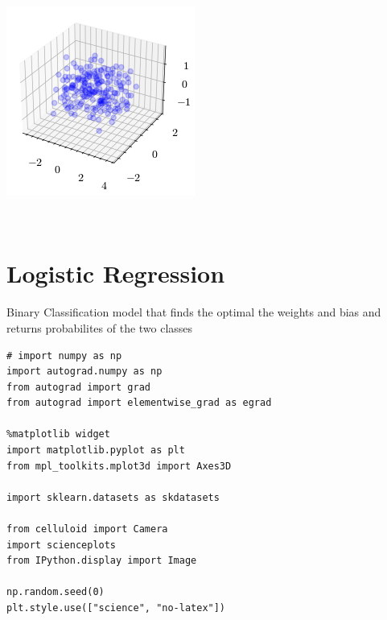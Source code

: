 \documentclass[openany]{book}
\begin{document}
    \begin{center}
    \includegraphics[width=\textwidth]{combined_files/combined_62_0.png}
    \end{center}
    { \hspace*{\fill} \\}
    
    \section{Logistic Regression}\label{logistic-regression}

Binary Classification model that finds the optimal the weights and bias
and returns probabilites of the two classes

\begin{tcolorbox}
\tiny
\begin{verbatim}
# import numpy as np
import autograd.numpy as np
from autograd import grad
from autograd import elementwise_grad as egrad

%matplotlib widget
import matplotlib.pyplot as plt
from mpl_toolkits.mplot3d import Axes3D

import sklearn.datasets as skdatasets

from celluloid import Camera
import scienceplots
from IPython.display import Image

np.random.seed(0)
plt.style.use(["science", "no-latex"])
\end{verbatim}
\end{tcolorbox}
\end{document}
